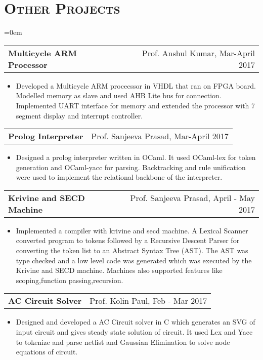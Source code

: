 \documentclass{article}
\makeatletter
\newenvironment{longversion}{}{} %
\newcommand{\headerrow}[2]
{\begin{tabular*}{\linewidth}{l@{\extracolsep{\fill}}r}
	#1 &
	#2 \\
\end{tabular*}}
\newcommand{\tmpsection}[1]{}
\let\tmpsection=\section
\renewcommand{\section}[1]{\tmpsection*{\textsc{#1}}}
\makeatother
\begin{document}
\begin{longversion}
\section{Other Projects}
\begin{list} {}{\leftmargin=0em}
\setlength{\leftmargin}{0pt}

\item[]
\headerrow {\textbf{Multicycle ARM Processor}}{Prof. Anshul Kumar, Mar-April 2017}
\begin{itemize} \item[]
Developed a Multicycle ARM procecssor in VHDL that ran on FPGA board. Modelled memory as slave and used AHB Lite bus for connection. Implemented UART interface for memory and extended the processor with 7 segment display and interrupt controller.
\end{itemize}

\item[]
\headerrow {\textbf{Prolog Interpreter}}{Prof. Sanjeeva Prasad, Mar-April 2017}
\begin{itemize} \item[] 
Designed a prolog interpreter written in OCaml. It used OCaml-lex for token generation and OCaml-yacc for parsing. Backtracking and rule unification were used to implement the relational backbone of the interpreter.
\end{itemize}

\item[]
\headerrow{ \textbf{Krivine and SECD Machine}} {Prof. Sanjeeva Prasad, April - May 2017}
\begin{itemize} \item[] 
Implemented a compiler with krivine and secd machine. A Lexical Scanner converted program to tokens followed by a Recursive Descent Parser for converting the token list to an Abstract Syntax Tree (AST). The AST was type checked and a low level code was generated which was executed by the Krivine and SECD machine. Machines also supported features like scoping,function passing,recursion.
\end{itemize}

\item[]
\headerrow { \textbf{AC Circuit Solver}} {Prof. Kolin Paul, Feb - Mar 2017}
\begin{itemize} \item[]
Designed and developed a AC Circuit solver in C which generates an SVG of input circuit and gives steady state solution of circuit. It used Lex and Yacc to tokenize and parse netlist and Gaussian Elimination to solve node equations of circuit. 
\end{itemize}


\end{list}
\end{longversion}
\end{document}
